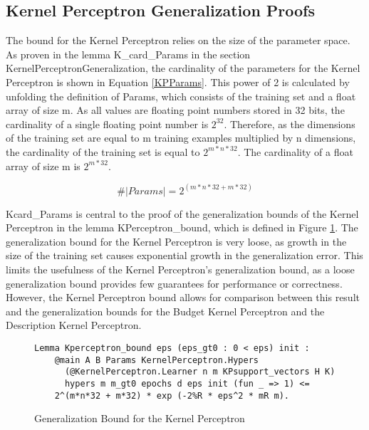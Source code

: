 \subsection{Kernel Perceptron Generalization Proofs}\label{KPProofs}
The bound for the Kernel Perceptron relies on the size of the parameter space. As proven in the lemma K\_card\_Params in the section KernelPerceptronGeneralization, the cardinality of the parameters for the Kernel Perceptron is shown in Equation \ref{KPParams}. This power of 2 is calculated by unfolding the definition of Params, which consists of the training set and a float array of size m. As all values are floating point numbers stored in 32 bits, the cardinality of a single floating point number is $2^{32}$. Therefore, as the dimensions of the training set are equal to m training examples multiplied by n dimensions, the cardinality of the training set is equal to $2^{m*n*32}$. The cardinality of a float array of size m is $2^{m * 32}$. 

\begin{equation} \label{KPParams}
 \#|Params| = 2^{(m*n*32 + m*32)}
\end{equation}

Kcard\_Params is central to the proof of the generalization bounds of the Kernel Perceptron in the lemma KPerceptron\_bound, which is defined in Figure \ref{KPLemma}. The generalization bound for the Kernel Perceptron is very loose, as growth in the size of the training set causes exponential growth in the generalization error. This limits the usefulness of the Kernel Perceptron's generalization bound, as a loose generalization bound provides few guarantees for performance or correctness. However, the Kernel Perceptron bound allows for comparison between this result and the generalization bounds for the Budget Kernel Perceptron and the Description Kernel Perceptron. 

\begin{figure}
    \caption{Generalization Bound for the Kernel Perceptron}
    \label{KPLemma}
    \begin{lstlisting}
Lemma Kperceptron_bound eps (eps_gt0 : 0 < eps) init : 
    @main A B Params KernelPerceptron.Hypers 
      (@KernelPerceptron.Learner n m KPsupport_vectors H K)
      hypers m m_gt0 epochs d eps init (fun _ => 1) <=
    2^(m*n*32 + m*32) * exp (-2%R * eps^2 * mR m).
    \end{lstlisting}
\end{figure}

